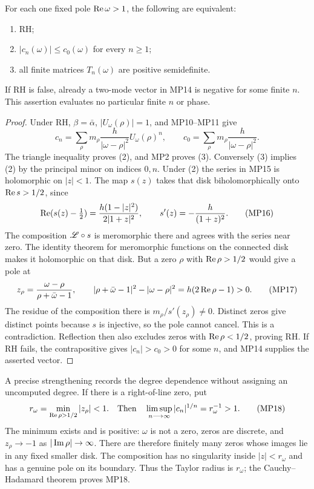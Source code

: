 \documentclass[11pt]{article}
\begin{document}
\begin{swpoletheorem}
For each one fixed pole $\operatorname{Re}\omega>1$, the following are equivalent:
\begin{enumerate}
\item RH;
\item $|c_n(\omega)|\leq c_0(\omega)$ for every $n\geq1$;
\item all finite matrices $T_n(\omega)$ are positive semidefinite.
\end{enumerate}
If RH is false, already a two-mode vector in MP14 is negative for some
finite $n$. This assertion evaluates no particular finite $n$ or phase.
\end{swpoletheorem}
\begin{proof}
Under RH, $\beta=\bar\alpha$, $|U_\omega(\rho)|=1$, and
MP10--MP11 give
\[
 c_n=\sum_\rho m_\rho\frac h{|\omega-\rho|^2}
                                      U_\omega(\rho)^n,
 \qquad c_0=\sum_\rho m_\rho\frac h{|\omega-\rho|^2}.
\]
The triangle inequality proves (2), and MP2 proves (3).
Conversely (3) implies (2) by the principal minor on indices $0,n$.
Under (2) the series in MP15 is holomorphic on $|z|<1$.
The map $s(z)$ takes that disk biholomorphically onto $\operatorname{Re} s>1/2$,
since
\begin{equation}
 \operatorname{Re}(s(z)-\tfrac12)=\frac{h(1-|z|^2)}{2|1+z|^2},\qquad
 s'(z)=-\frac h{(1+z)^2}.\tag{MP16}
\end{equation}
The composition $\mathscr L\circ s$ is meromorphic there and agrees with the
series near zero. The identity theorem for meromorphic functions on the
connected disk makes it holomorphic on that disk. But a zero $\rho$ with
$\operatorname{Re}\rho>1/2$ would give a pole at
\begin{equation}
 z_\rho=\frac{\omega-\rho}{\rho+\bar\omega-1},\qquad
 |\rho+\bar\omega-1|^2-|\omega-\rho|^2
                       =h(2\operatorname{Re}\rho-1)>0.\tag{MP17}
\end{equation}
The residue of the composition there is
$m_\rho/s'(z_\rho)\ne0$. Distinct zeros give distinct points because
$s$ is injective, so the pole cannot cancel. This is a contradiction.
Reflection then also excludes zeros with $\operatorname{Re}\rho<1/2$, proving RH.
If RH fails, the contrapositive gives $|c_n|>c_0>0$ for some $n$,
and MP14 supplies the asserted vector.
\end{proof}

A precise strengthening records the degree dependence without assigning
an uncomputed degree. If there is a right-of-line zero, put
\begin{equation}
 r_\omega=\min_{\operatorname{Re}\rho>1/2}|z_\rho|<1.
 \quad\text{Then}\quad
 \limsup_{n\longrightarrow\infty}|c_n|^{1/n}=r_\omega^{-1}>1.
 \tag{MP18}
\end{equation}
The minimum exists and is positive: $\omega$ is not a zero, zeros are
discrete, and $z_\rho\to-1$ as $|\operatorname{Im}\rho|\to\infty$. There are
therefore finitely many zeros whose images lie in any fixed smaller disk.
The composition has no singularity inside $|z|<r_\omega$ and has a
genuine pole on its boundary. Thus the Taylor radius is $r_\omega$;
the Cauchy--Hadamard theorem proves MP18.
\end{document}
